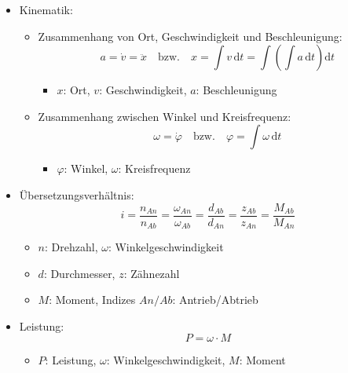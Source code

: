 \documentclass[12pt]{article}
\begin{document}
\begin{itemize}
\begin{itemize}
\begin{itemize}
            \item \(\dot{x}\): Geschwindigkeit, \(\dot{\Phi}\): Winkelgeschwindigkeit
            \item \(F_D\): Dämpferkraft, \(M_D\): Dämpfermoment
        \end{itemize}
    \end{itemize}
    \item Kinematik:
    \begin{itemize}
        \item Zusammenhang von Ort, Geschwindigkeit und Beschleunigung:
        \[
        a=\dot{v}=\ddot{x}
        \quad\text{bzw.}\quad
        x=\int v\,\mathrm{d}t=\int\!\!\left(\int a\,\mathrm{d}t\right)\mathrm{d}t
        \]
        \begin{itemize}
            \item \(x\): Ort, \(v\): Geschwindigkeit, \(a\): Beschleunigung
        \end{itemize}
        \item Zusammenhang zwischen Winkel und Kreisfrequenz:
        \[
        \omega=\dot{\varphi}
        \quad\text{bzw.}\quad
        \varphi=\int \omega\,\mathrm{d}t
        \]
        \begin{itemize}
            \item \(\varphi\): Winkel, \(\omega\): Kreisfrequenz
        \end{itemize}
    \end{itemize}
    \item Übersetzungsverhältnis:
    \[
    i=\frac{n_{An}}{n_{Ab}}=\frac{\omega_{An}}{\omega_{Ab}}
    =\frac{d_{Ab}}{d_{An}}=\frac{z_{Ab}}{z_{An}}=\frac{M_{Ab}}{M_{An}}
    \]
    \begin{itemize}
        \item \(n\): Drehzahl, \(\omega\): Winkelgeschwindigkeit
        \item \(d\): Durchmesser, \(z\): Zähnezahl
        \item \(M\): Moment, Indizes \(An/Ab\): Antrieb/Abtrieb
    \end{itemize}
    \item Leistung:
    \[
    P=\omega\cdot M
    \]
    \begin{itemize}
        \item \(P\): Leistung, \(\omega\): Winkelgeschwindigkeit, \(M\): Moment
    \end{itemize}
\end{itemize}
\end{document}
